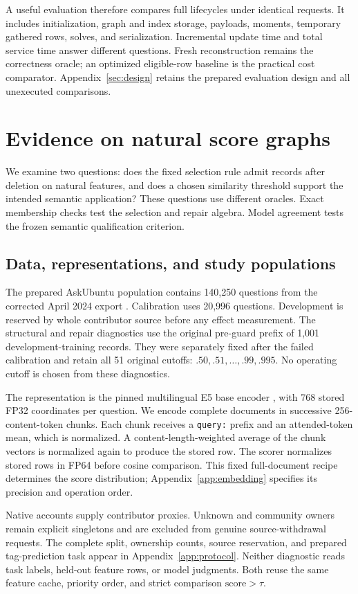 A useful evaluation therefore compares full lifecycles under identical
requests. It includes initialization, graph and index storage, payloads,
moments, temporary gathered rows, solves, and serialization. Incremental
update time and total service time answer different questions. Fresh
reconstruction remains the correctness oracle; an optimized eligible-row
baseline is the practical cost comparator. Appendix~\ref{sec:design}
retains the prepared evaluation design and all unexecuted comparisons.

\section{Evidence on natural score graphs}\label{sec:evidence}
We examine two questions: does the fixed selection rule admit records
after deletion on natural features, and does a chosen similarity threshold
support the intended semantic application? These questions use different
oracles. Exact membership checks test the selection and repair algebra.
Model agreement tests the frozen semantic qualification criterion.

\subsection{Data, representations, and study populations}\label{sec:study}
The prepared AskUbuntu population contains 140,250 questions from the
corrected April 2024 export \citep{askubuntu}. Calibration uses 20,996
questions. Development is reserved by whole contributor source before
any effect measurement. The structural and repair diagnostics use the
original pre-guard prefix of 1,001 development-training records. They
were separately fixed after the failed calibration and retain all 51
original cutoffs: $.50,.51,\ldots,.99,.995$. No operating cutoff is
chosen from these diagnostics.

The representation is the pinned multilingual E5 base encoder \citep{e5},
with 768 stored FP32 coordinates per question. We encode complete documents
in successive 256-content-token chunks. Each chunk receives a
\texttt{query:} prefix and an attended-token mean, which is normalized.
A content-length-weighted average of the chunk vectors is normalized
again to produce the stored row. The scorer normalizes stored rows in
FP64 before cosine comparison. This fixed full-document recipe determines
the score distribution; Appendix~\ref{app:embedding} specifies its precision
and operation order.

Native accounts supply contributor proxies. Unknown and community owners
remain explicit singletons and are excluded from genuine source-withdrawal
requests. The complete split, ownership counts, source reservation, and
prepared tag-prediction task appear in Appendix~\ref{app:protocol}.
Neither diagnostic reads task labels, held-out feature rows, or model
judgments. Both reuse the same feature cache, priority order, and strict
comparison $\mathrm{score}>\tau$.


